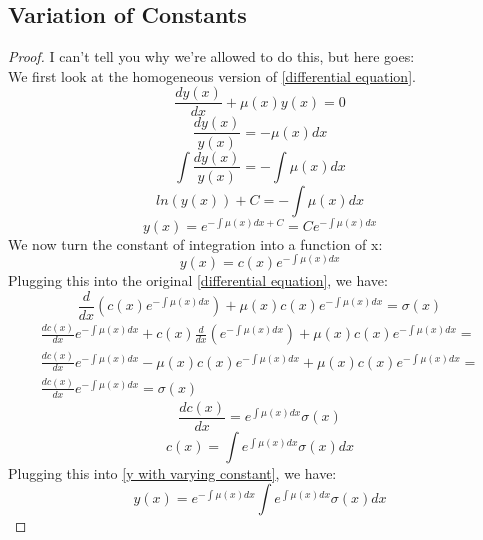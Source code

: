 \documentclass{article}
\begin{document}
    \subsection{Variation of Constants}
    \begin{proof}
        I can't tell you why we're allowed to do this, but here goes:\\
        We first look at the homogeneous version of \cref{differential equation}.
        \[ \frac{dy(x)}{dx}+\mu(x)y(x) = 0 \]
        \[ \frac{dy(x)}{y(x)} = -\mu(x)dx \]
        \[ \int \frac{dy(x)}{y(x)} = -\int \mu(x)dx \]
        \[ ln(y(x)) + C = -\int \mu(x)dx \]
        \[ y(x) = e^{-\int \mu(x)dx + C} = Ce^{-\int \mu(x)dx} \]
        We now turn the constant of integration into a function of x:
        \begin{equation} \label{y with varying constant}
            y(x) = c(x)e^{-\int \mu(x)dx}
        \end{equation}
        Plugging this into the original \cref{differential equation}, we have:
        \[ \frac{d}{dx}(c(x)e^{-\int \mu(x)dx}) + \mu(x)c(x)e^{-\int \mu(x)dx} = \sigma(x) \]
        \begin{equation*}
        \begin{split}
            \frac{dc(x)}{dx}e^{-\int \mu(x)dx} + c(x)\frac{d}{dx}(e^{-\int \mu(x)dx}) + \mu(x)c(x)e^{-\int \mu(x)dx} =\\
            \frac{dc(x)}{dx}e^{-\int \mu(x)dx} - \mu(x)c(x)e^{-\int \mu(x)dx} + \mu(x)c(x)e^{-\int \mu(x)dx} =\\
            \frac{dc(x)}{dx}e^{-\int \mu(x)dx} = \sigma(x)
        \end{split}
        \end{equation*}
        \[ \frac{dc(x)}{dx} = e^{\int \mu(x)dx}\sigma(x) \]
        \[ c(x) = \int e^{\int \mu(x)dx}\sigma(x) dx \]
        Plugging this into \cref{y with varying constant}, we have:
        \[ y(x) = e^{-\int \mu(x)dx} \int e^{\int \mu(x)dx}\sigma(x)dx \]
    \end{proof}
\end{document}
